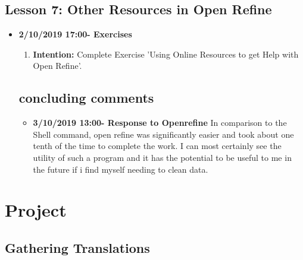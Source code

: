 \documentclass{article}
\begin{document}
\subsection{Lesson 7: Other Resources in Open Refine}

\begin{itemize}
\item{\textbf{2/10/2019 17:00- Exercises}}

\begin{enumerate}

\item{\textbf{Intention:} Complete Exercise 'Using Online Resources to get Help with Open Refine'.}


\end{enumerate}


\subsection{concluding comments}
\begin{itemize}
\item{\textbf{3/10/2019 13:00- Response to Openrefine} In comparison to the Shell command, open refine was significantly easier and took about one tenth of the time to complete the work. I can most certainly see the utility of such a program and it has the potential to be useful to me in the future if i find myself needing to clean data.} 
\end{itemize}
\end{itemize}

\section{Project}
\subsection{Gathering Translations}
\end{document}
